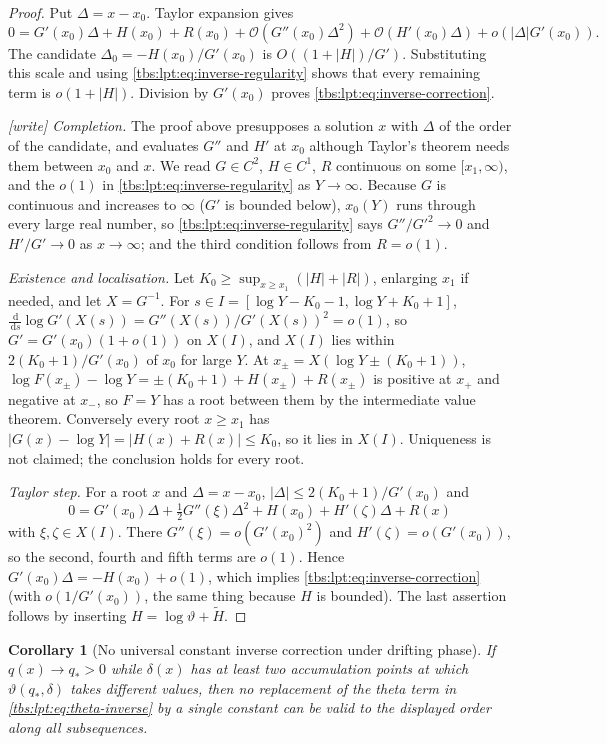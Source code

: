 \documentclass[11pt,a4paper]{article}
\numberwithin{equation}{section}
\newtheorem{corollary}[theorem]{Corollary}
\theoremstyle{definition}
\newcommand{\dd}{\,\mathrm d}
\newcommand{\OO}{\mathcal O}
\begin{document}
\begin{proof}
Put $\Delta=x-x_0$. Taylor expansion gives
\[
 0=G'(x_0)\Delta+H(x_0)+R(x_0)
 +\OO(G''(x_0)\Delta^2)+\OO(H'(x_0)\Delta)+o(|\Delta|G'(x_0)).
\]
The candidate $\Delta_0=-H(x_0)/G'(x_0)$ is $O((1+|H|)/G')$. Substituting
this scale and using \eqref{tbs:lpt:eq:inverse-regularity} shows that
every remaining term is $o(1+|H|)$. Division by $G'(x_0)$ proves
\eqref{tbs:lpt:eq:inverse-correction}.

\emph{[write] Completion.} The proof above presupposes a solution $x$
with $\Delta$ of the order of the candidate, and evaluates $G''$ and $H'$
at $x_0$ although Taylor's theorem needs them between $x_0$ and $x$. We
read $G\in C^2$, $H\in C^1$, $R$ continuous on some $[x_1,\infty)$, and
the $o(1)$ in \eqref{tbs:lpt:eq:inverse-regularity} as $Y\to\infty$.
Because $G$ is continuous and increases to $\infty$ ($G'$ is bounded
below), $x_0(Y)$ runs through every large real number, so
\eqref{tbs:lpt:eq:inverse-regularity} says $G''/G'^2\to0$ and
$H'/G'\to0$ as $x\to\infty$; and the third condition follows from
$R=o(1)$.

\emph{Existence and localisation.} Let $K_0\ge\sup_{x\ge x_1}(|H|+|R|)$,
enlarging $x_1$ if needed, and let $X=G^{-1}$. For
$s\in I=[\log Y-K_0-1,\log Y+K_0+1]$,
$\frac{\dd}{\dd s}\log G'(X(s))=G''(X(s))/G'(X(s))^2=o(1)$, so
$G'=G'(x_0)(1+o(1))$ on $X(I)$, and $X(I)$ lies within
$2(K_0+1)/G'(x_0)$ of $x_0$ for large $Y$. At $x_\pm=X(\log Y\pm(K_0+1))$,
$\log F(x_\pm)-\log Y=\pm(K_0+1)+H(x_\pm)+R(x_\pm)$ is positive at $x_+$
and negative at $x_-$, so $F=Y$ has a root between them by the
intermediate value theorem. Conversely every root $x\ge x_1$ has
$|G(x)-\log Y|=|H(x)+R(x)|\le K_0$, so it lies in $X(I)$. Uniqueness is
not claimed; the conclusion holds for every root.

\emph{Taylor step.} For a root $x$ and $\Delta=x-x_0$,
$|\Delta|\le2(K_0+1)/G'(x_0)$ and
\[
 0=G'(x_0)\Delta+\tfrac12G''(\xi)\Delta^2+H(x_0)+H'(\zeta)\Delta+R(x)
\]
with $\xi,\zeta\in X(I)$. There $G''(\xi)=o(G'(x_0)^2)$ and
$H'(\zeta)=o(G'(x_0))$, so the second, fourth and fifth terms are $o(1)$.
Hence $G'(x_0)\Delta=-H(x_0)+o(1)$, which implies
\eqref{tbs:lpt:eq:inverse-correction} (with $o(1/G'(x_0))$, the same
thing because $H$ is bounded). The last assertion follows by inserting
$H=\log\vartheta+\tilde H$.
\end{proof}

\begin{corollary}[No universal constant inverse correction under drifting phase]\label{tbs:lpt:cor:no-constant}
If $q(x)\to q_*>0$ while $\delta(x)$ has at least two accumulation points
at which $\vartheta(q_*,\delta)$ takes different values, then no
replacement of the theta term in \eqref{tbs:lpt:eq:theta-inverse} by a
single constant can be valid to the displayed order along all
subsequences.
\end{corollary}
\end{document}
